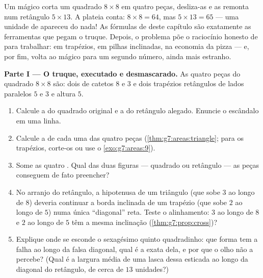 \begin{problem}[{Problema de fim de semana --- uma ``demonstração''
famosa de que $64 = 65$, desmascarada por áreas e inclinações, com
pizzas e anéis de sobremesa}]
\label{pb:g7:areas:1}
Um mágico corta um quadrado $8 \times 8$ em quatro peças, desliza-as e
as remonta num retângulo $5 \times 13$. A plateia conta:
$8 \times 8 = 64$, mas $5 \times 13 = 65$ --- uma unidade de 
apareceu do nada! As fórmulas de  deste capítulo são exatamente as
ferramentas que pegam o truque. Depois, o problema põe o raciocínio
honesto de  para trabalhar: em trapézios, em pilhas inclinadas, na
economia da pizza --- e, por fim, volta ao mágico para um segundo
número, ainda mais estranho.

\medskip
\noindent\textbf{Parte I --- O truque, executado e desmascarado.}
As quatro peças do quadrado $8 \times 8$ são: dois  de catetos $8$ e $3$ e dois trapézios retângulos de lados
paralelos $5$ e $3$ e altura $5$.
\begin{enumerate}
  \item Calcule a  do quadrado original e a  do retângulo
        alegado. Enuncie o escândalo em uma linha.
  \item Calcule a  de cada uma das quatro peças
        (\cref{thm:g7:areas:triangle}; para os trapézios, corte-os ou
        use o \cref{exo:g7:areas:9}).
  \item Some as quatro . Qual das duas figuras --- quadrado ou
        retângulo --- as peças conseguem de fato preencher?
  \item No arranjo do retângulo, a hipotenusa de um triângulo (que sobe
        $3$ ao longo de $8$) deveria continuar a borda inclinada de um
        trapézio (que sobe $2$ ao longo de $5$) numa única
        ``diagonal'' reta. Teste o alinhamento: $3$ ao longo de $8$ e
        $2$ ao longo de $5$ têm a mesma inclinação
        (\cref{thm:g7:prop:cross})?
  \item Explique onde se esconde o sexagésimo quinto quadradinho: que
        forma tem a falha ao longo da falsa diagonal, qual é a 
        exata dela, e por que o olho não a percebe? (Qual é a largura
        média de uma lasca dessa  esticada ao longo da diagonal do
        retângulo, de cerca de $13$ unidades?)
\end{enumerate}


\end{problem}
